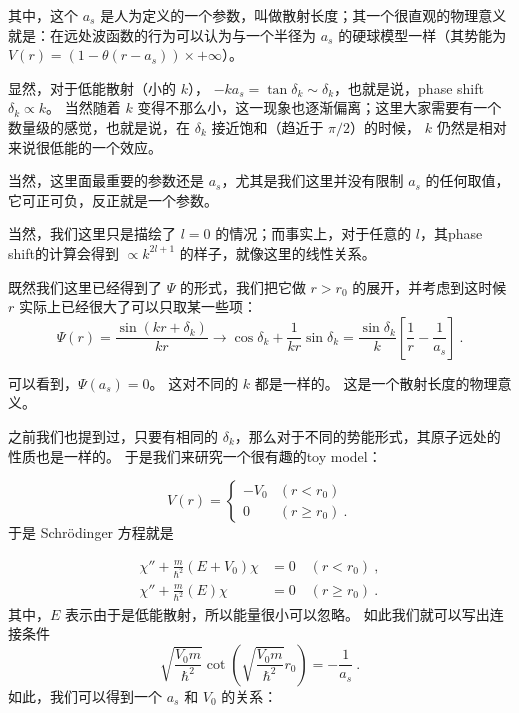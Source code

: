其中，这个 $a_s$ 是人为定义的一个参数，叫做散射长度；其一个很直观的物理意义就是：在远处波函数的行为可以认为与一个半径为 $a_s$ 的硬球模型一样（其势能为 $V(r) = (1-\theta(r-a_s)) \times +\infty$）。

显然，对于低能散射（小的 $k$）， $-ka_s = \tan\delta_k \sim \delta_k$，也就是说，phase shift $\delta_k \propto k$。 当然随着 $k$ 变得不那么小，这一现象也逐渐偏离；这里大家需要有一个数量级的感觉，也就是说，在 $\delta_k$ 接近饱和（趋近于 $\pi/2$）的时候， $k$ 仍然是相对来说很低能的一个效应。

当然，这里面最重要的参数还是 $a_s$，尤其是我们这里并没有限制 $a_s$ 的任何取值，它可正可负，反正就是一个参数。

当然，我们这里只是描绘了 $l = 0$ 的情况；而事实上，对于任意的 $l$，其phase shift的计算会得到 $\propto k^{2l+1}$ 的样子，就像这里的线性关系。

既然我们这里已经得到了 $\Psi$ 的形式，我们把它做 $r>r_0$ 的展开，并考虑到这时候 $r$ 实际上已经很大了可以只取某一些项：
\begin{equation}
\Psi(r) = \frac{\sin(kr+\delta_k)}{kr} \to \cos\delta_k +\frac{1}{kr}\sin\delta_k = \frac{\sin\delta_k}{k}\left[\frac{1}{r}-\frac{1}{a_s}\right]~.
\end{equation}

可以看到，$\Psi(a_s)=0$。 这对不同的 $k$ 都是一样的。 这是一个散射长度的物理意义。

之前我们也提到过，只要有相同的 $\delta_k$，那么对于不同的势能形式，其原子远处的性质也是一样的。 于是我们来研究一个很有趣的toy model：

\begin{equation}
V(r)=\begin{cases}
-V_0 & (r<r_0)\\
0 & (r\geqslant r_0)~.
\end{cases}
\end{equation}
于是 Schrödinger 方程就是

\begin{align}
\chi'' + \frac{m}{\hbar^2}(E+V_0)\chi &= 0\quad (r < r_0)~,\\
\chi'' + \frac{m}{\hbar^2}(E)\chi &= 0\quad (r \geqslant r_0)~.
\end{align}
其中，$E$ 表示由于是低能散射，所以能量很小可以忽略。 如此我们就可以写出连接条件
\begin{equation}
\sqrt{\frac{V_0 m}{\hbar^2}}\cot\left(\sqrt{\frac{V_0 m}{\hbar^2}}r_0\right) = -\frac{1}{a_s}~.
\end{equation}
如此，我们可以得到一个 $a_s$ 和 $V_0$ 的关系：

